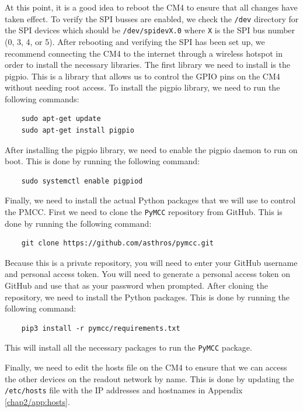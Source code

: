 At this point, it is a good idea to reboot the CM4 to ensure that all changes have taken effect.
To verify the SPI busses are enabled, we check the \texttt{/dev} directory for the SPI devices which should be \texttt{/dev/spidevX.0} where \texttt{X} is the SPI bus number (0, 3, 4, or 5).
After rebooting and verifying the SPI has been set up, we recommend connecting the CM4 to the internet through a wireless hotspot in order to install the necessary libraries.
The first library we need to install is the pigpio.
This is a library that allows us to control the GPIO pins on the CM4 without needing root access.
To install the pigpio library, we need to run the following commands:
\begin{verbatim}
    sudo apt-get update
    sudo apt-get install pigpio
\end{verbatim}
After installing the pigpio library, we need to enable the pigpio daemon to run on boot.
This is done by running the following command:
\begin{verbatim}
    sudo systemctl enable pigpiod
\end{verbatim}

Finally, we need to install the actual Python packages that we will use to control the PMCC.
First we need to clone the \texttt{PyMCC} repository from GitHub.
This is done by running the following command:
\begin{verbatim}
    git clone https://github.com/asthros/pymcc.git
\end{verbatim}
Because this is a private repository, you will need to enter your GitHub username and personal access token.
You will need to generate a personal access token on GitHub and use that as your password when prompted.
After cloning the repository, we need to install the Python packages.
This is done by running the following command:
\begin{verbatim}
    pip3 install -r pymcc/requirements.txt
\end{verbatim}
This will install all the necessary packages to run the \texttt{PyMCC} package.

Finally, we need to edit the hosts file on the CM4 to ensure that we can access the other devices on the readout network by name.
This is done by updating the \texttt{/etc/hosts} file with the IP addresses and hostnames in Appendix \ref{chap2/app:hosts}.

